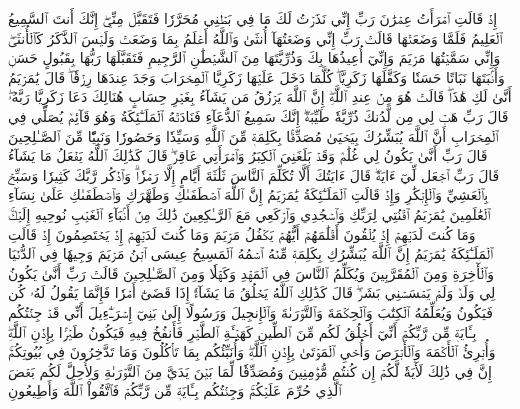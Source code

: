إِذۡ قَالَتِ ٱمۡرَأَتُ عِمۡرَٰنَ رَبِّ إِنِّي نَذَرۡتُ لَكَ مَا فِي بَطۡنِي مُحَرَّرٗا فَتَقَبَّلۡ مِنِّيٓۖ إِنَّكَ أَنتَ ٱلسَّمِيعُ ٱلۡعَلِيمُ
فَلَمَّا وَضَعَتۡهَا قَالَتۡ رَبِّ إِنِّي وَضَعۡتُهَآ أُنثَىٰ وَٱللَّهُ أَعۡلَمُ بِمَا وَضَعَتۡ وَلَيۡسَ ٱلذَّكَرُ كَٱلۡأُنثَىٰۖ وَإِنِّي سَمَّيۡتُهَا مَرۡيَمَ وَإِنِّيٓ أُعِيذُهَا بِكَ وَذُرِّيَّتَهَا مِنَ ٱلشَّيۡطَٰنِ ٱلرَّجِيمِ
فَتَقَبَّلَهَا رَبُّهَا بِقَبُولٍ حَسَنٖ وَأَنۢبَتَهَا نَبَاتًا حَسَنٗا وَكَفَّلَهَا زَكَرِيَّاۖ كُلَّمَا دَخَلَ عَلَيۡهَا زَكَرِيَّا ٱلۡمِحۡرَابَ وَجَدَ عِندَهَا رِزۡقٗاۖ قَالَ يَٰمَرۡيَمُ أَنَّىٰ لَكِ هَٰذَاۖ قَالَتۡ هُوَ مِنۡ عِندِ ٱللَّهِۖ إِنَّ ٱللَّهَ يَرۡزُقُ مَن يَشَآءُ بِغَيۡرِ حِسَابٍ
هُنَالِكَ دَعَا زَكَرِيَّا رَبَّهُۥۖ قَالَ رَبِّ هَبۡ لِي مِن لَّدُنكَ ذُرِّيَّةٗ طَيِّبَةًۖ إِنَّكَ سَمِيعُ ٱلدُّعَآءِ
فَنَادَتۡهُ ٱلۡمَلَـٰٓئِكَةُ وَهُوَ قَآئِمٞ يُصَلِّي فِي ٱلۡمِحۡرَابِ أَنَّ ٱللَّهَ يُبَشِّرُكَ بِيَحۡيَىٰ مُصَدِّقَۢا بِكَلِمَةٖ مِّنَ ٱللَّهِ وَسَيِّدٗا وَحَصُورٗا وَنَبِيّٗا مِّنَ ٱلصَّـٰلِحِينَ
قَالَ رَبِّ أَنَّىٰ يَكُونُ لِي غُلَٰمٞ وَقَدۡ بَلَغَنِيَ ٱلۡكِبَرُ وَٱمۡرَأَتِي عَاقِرٞۖ قَالَ كَذَٰلِكَ ٱللَّهُ يَفۡعَلُ مَا يَشَآءُ
قَالَ رَبِّ ٱجۡعَل لِّيٓ ءَايَةٗۖ قَالَ ءَايَتُكَ أَلَّا تُكَلِّمَ ٱلنَّاسَ ثَلَٰثَةَ أَيَّامٍ إِلَّا رَمۡزٗاۗ وَٱذۡكُر رَّبَّكَ كَثِيرٗا وَسَبِّحۡ بِٱلۡعَشِيِّ وَٱلۡإِبۡكَٰرِ
وَإِذۡ قَالَتِ ٱلۡمَلَـٰٓئِكَةُ يَٰمَرۡيَمُ إِنَّ ٱللَّهَ ٱصۡطَفَىٰكِ وَطَهَّرَكِ وَٱصۡطَفَىٰكِ عَلَىٰ نِسَآءِ ٱلۡعَٰلَمِينَ
يَٰمَرۡيَمُ ٱقۡنُتِي لِرَبِّكِ وَٱسۡجُدِي وَٱرۡكَعِي مَعَ ٱلرَّـٰكِعِينَ
ذَٰلِكَ مِنۡ أَنۢبَآءِ ٱلۡغَيۡبِ نُوحِيهِ إِلَيۡكَۚ وَمَا كُنتَ لَدَيۡهِمۡ إِذۡ يُلۡقُونَ أَقۡلَٰمَهُمۡ أَيُّهُمۡ يَكۡفُلُ مَرۡيَمَ وَمَا كُنتَ لَدَيۡهِمۡ إِذۡ يَخۡتَصِمُونَ
إِذۡ قَالَتِ ٱلۡمَلَـٰٓئِكَةُ يَٰمَرۡيَمُ إِنَّ ٱللَّهَ يُبَشِّرُكِ بِكَلِمَةٖ مِّنۡهُ ٱسۡمُهُ ٱلۡمَسِيحُ عِيسَى ٱبۡنُ مَرۡيَمَ وَجِيهٗا فِي ٱلدُّنۡيَا وَٱلۡأٓخِرَةِ وَمِنَ ٱلۡمُقَرَّبِينَ
وَيُكَلِّمُ ٱلنَّاسَ فِي ٱلۡمَهۡدِ وَكَهۡلٗا وَمِنَ ٱلصَّـٰلِحِينَ
قَالَتۡ رَبِّ أَنَّىٰ يَكُونُ لِي وَلَدٞ وَلَمۡ يَمۡسَسۡنِي بَشَرٞۖ قَالَ كَذَٰلِكِ ٱللَّهُ يَخۡلُقُ مَا يَشَآءُۚ إِذَا قَضَىٰٓ أَمۡرٗا فَإِنَّمَا يَقُولُ لَهُۥ كُن فَيَكُونُ
وَيُعَلِّمُهُ ٱلۡكِتَٰبَ وَٱلۡحِكۡمَةَ وَٱلتَّوۡرَىٰةَ وَٱلۡإِنجِيلَ
وَرَسُولًا إِلَىٰ بَنِيٓ إِسۡرَـٰٓءِيلَ أَنِّي قَدۡ جِئۡتُكُم بِـَٔايَةٖ مِّن رَّبِّكُمۡ أَنِّيٓ أَخۡلُقُ لَكُم مِّنَ ٱلطِّينِ كَهَيۡـَٔةِ ٱلطَّيۡرِ فَأَنفُخُ فِيهِ فَيَكُونُ طَيۡرَۢا بِإِذۡنِ ٱللَّهِۖ وَأُبۡرِئُ ٱلۡأَكۡمَهَ وَٱلۡأَبۡرَصَ وَأُحۡيِ ٱلۡمَوۡتَىٰ بِإِذۡنِ ٱللَّهِۖ وَأُنَبِّئُكُم بِمَا تَأۡكُلُونَ وَمَا تَدَّخِرُونَ فِي بُيُوتِكُمۡۚ إِنَّ فِي ذَٰلِكَ لَأٓيَةٗ لَّكُمۡ إِن كُنتُم مُّؤۡمِنِينَ
وَمُصَدِّقٗا لِّمَا بَيۡنَ يَدَيَّ مِنَ ٱلتَّوۡرَىٰةِ وَلِأُحِلَّ لَكُم بَعۡضَ ٱلَّذِي حُرِّمَ عَلَيۡكُمۡۚ وَجِئۡتُكُم بِـَٔايَةٖ مِّن رَّبِّكُمۡ فَٱتَّقُواْ ٱللَّهَ وَأَطِيعُونِ
